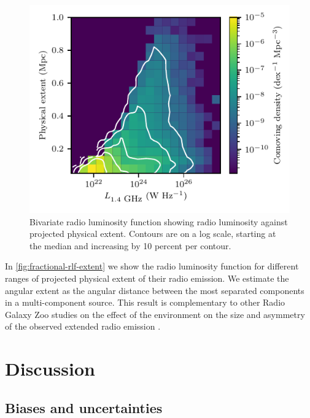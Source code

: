       \begin{figure}
          \centering
        \includegraphics{rlf-images/physical-extent.pdf}
        \caption[Bivariate radio luminosity function showing radio luminosity against projected physical extent.]{Bivariate radio luminosity function showing radio luminosity against projected physical extent. Contours are on a log scale, starting at the median and increasing by 10 percent per contour.
        \label{fig:fractional-rlf-extent}}
      \end{figure}

      In \autoref{fig:fractional-rlf-extent} we show the radio luminosity
      function for different ranges of projected physical extent of their radio emission. We estimate the angular extent as the angular distance between the most separated components in a multi-component source. This result is complementary to other Radio Galaxy Zoo studies on the effect of the environment on the size and asymmetry of the observed extended radio emission \citep{rodman19asymmetry,garon19bending}.


\section{Discussion}\label{sec:rlfs-discussion}

  \subsection{Biases and uncertainties}
    \label{sec:rlfs-bias}

